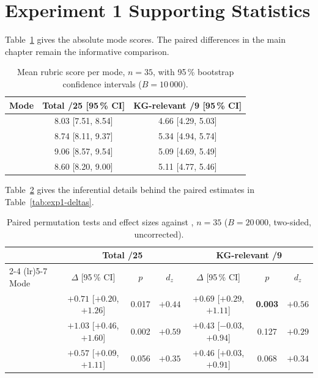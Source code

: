 \section{Experiment 1 Supporting Statistics}
\label{app:supporting-multiplicity}

Table~\ref{tab:exp1-means} gives the absolute mode scores. The paired
differences in the main chapter remain the informative comparison.

\begin{table}[htbp]
    \centering
    \caption{Mean rubric score per mode, $n = 35$, with 95\,\% bootstrap
             confidence intervals ($B = 10\,000$).}
    \label{tab:exp1-means}
    \small
    \begin{tabular}{lcc}
        \toprule
        Mode & Total /25 [95\,\% CI] & KG-relevant /9 [95\,\% CI] \\
        \midrule
        \baseline{} & 8.03 [7.51, 8.54] & 4.66 [4.29, 5.03] \\
        \kg{}       & 8.74 [8.11, 9.37] & 5.34 [4.94, 5.74] \\
        \rag{}      & 9.06 [8.57, 9.54] & 5.09 [4.69, 5.49] \\
        \hybrid{}   & 8.60 [8.20, 9.00] & 5.11 [4.77, 5.46] \\
        \bottomrule
    \end{tabular}
\end{table}

Table~\ref{tab:exp1-deltas-full} gives the inferential details behind the
paired estimates in Table~\ref{tab:exp1-deltas}.

\begin{table}[htbp]
    \centering
    \caption{Paired permutation tests and effect sizes against \baseline{},
             $n = 35$ ($B = 20\,000$, two-sided, uncorrected).}
    \label{tab:exp1-deltas-full}
    \small
    \begin{tabular}{lcccccc}
        \toprule
        & \multicolumn{3}{c}{Total /25} & \multicolumn{3}{c}{KG-relevant /9} \\
        \cmidrule(lr){2-4} \cmidrule(lr){5-7}
        Mode & $\Delta$ [95\,\% CI] & $p$ & $d_z$ & $\Delta$ [95\,\% CI] & $p$ & $d_z$ \\
        \midrule
        \kg{}     & $+0.71$ [$+0.20$, $+1.26$] & 0.017 & $+0.44$ & $+0.69$ [$+0.29$, $+1.11$] & \textbf{0.003} & $+0.56$ \\
        \rag{}    & $+1.03$ [$+0.46$, $+1.60$] & 0.002 & $+0.59$ & $+0.43$ [$-0.03$, $+0.94$] & 0.127 & $+0.29$ \\
        \hybrid{} & $+0.57$ [$+0.09$, $+1.11$] & 0.056 & $+0.35$ & $+0.46$ [$+0.03$, $+0.91$] & 0.068 & $+0.34$ \\
        \bottomrule
    \end{tabular}
\end{table}

